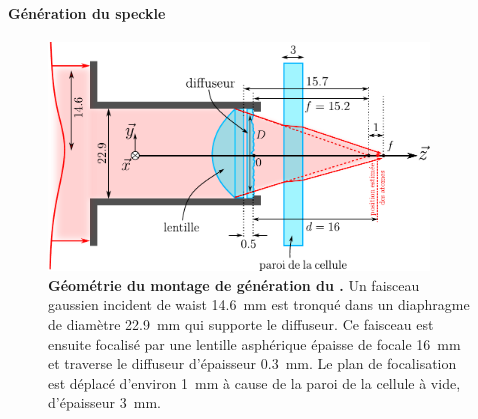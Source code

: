 




\paragraph*{Génération du speckle}

\begin{figure}
\centering
\includegraphics[width=0.9\textwidth]{Fig/Speckle/montage_diffuseur.pdf}
\caption{\textbf{Géométrie du montage de génération du \speckle .} Un faisceau gaussien incident de waist \SI{14.6}{\milli\metre} est tronqué dans un diaphragme de diamètre \SI{22.9}{\milli\metre} qui supporte le diffuseur. Ce faisceau est ensuite focalisé par une lentille asphérique épaisse de focale \SI{16}{\milli\metre} et traverse le diffuseur d'épaisseur \SI{0.3}{\milli\metre}. Le plan de focalisation est déplacé d'environ \SI{1}{\milli\metre} à cause de la paroi de la cellule à vide, d'épaisseur \SI{3}{\milli\metre}.}
\label{fig:montage_diffuseur}
\end{figure}

